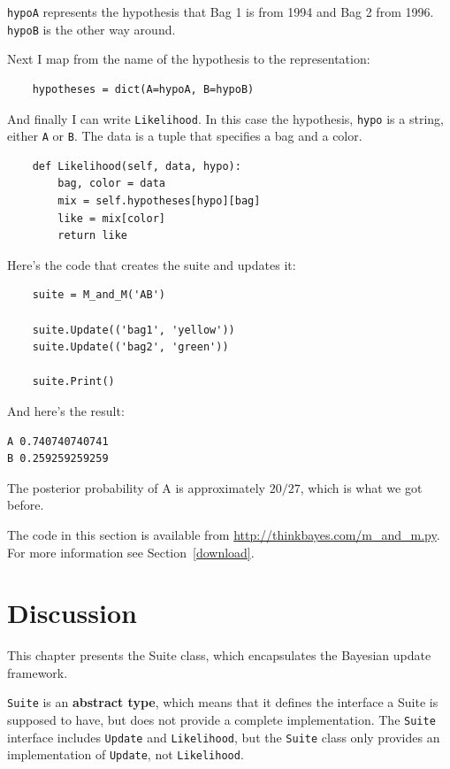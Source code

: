 \documentclass[12pt]{book}
\begin{document}
\verb"hypoA" represents the hypothesis that Bag 1 is from
1994 and Bag 2 from 1996.  \verb"hypoB" is the other way
around.

Next I map from the name of the hypothesis to the representation:

\begin{verbatim}
    hypotheses = dict(A=hypoA, B=hypoB)
\end{verbatim}

And finally I can write \verb"Likelihood".  In this case
the hypothesis, \verb"hypo" is a string, either \verb"A" or \verb"B".
The data is a tuple that specifies a bag
and a color.

\begin{verbatim}
    def Likelihood(self, data, hypo):
        bag, color = data
        mix = self.hypotheses[hypo][bag]
        like = mix[color]
        return like
\end{verbatim}

Here's the code that creates the suite and updates it:

\begin{verbatim}
    suite = M_and_M('AB')

    suite.Update(('bag1', 'yellow'))
    suite.Update(('bag2', 'green'))

    suite.Print()
\end{verbatim}

And here's the result:

\begin{verbatim}
A 0.740740740741
B 0.259259259259
\end{verbatim}

The posterior probability of A is approximately $20/27$, which
is what we got before.

The code in this section is available from
\url{http://thinkbayes.com/m_and_m.py}.
  For more information
see Section~\ref{download}.

\section{Discussion}

This chapter presents the Suite class, which encapsulates the 
Bayesian update framework.

{\tt Suite} is an {\bf abstract type}, which means that it defines the
interface a Suite is supposed to have, but does not provide a complete
implementation.  The {\tt Suite} interface includes {\tt Update} and
{\tt Likelihood}, but the {\tt Suite} class only provides an
implementation of {\tt Update}, not {\tt Likelihood}.
  
\end{document}
